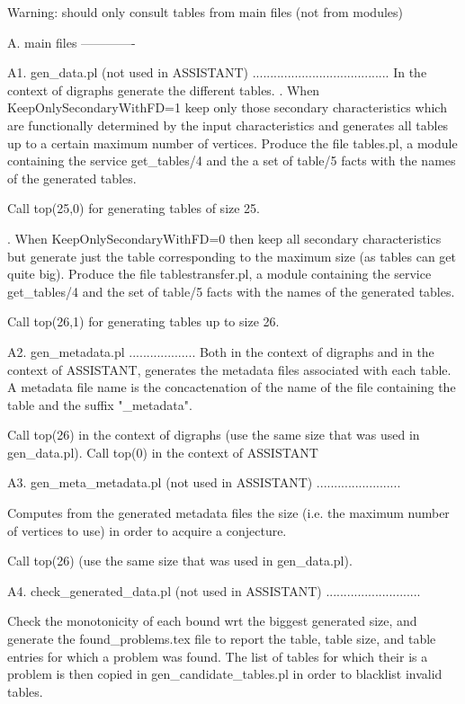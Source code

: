 Warning: should only consult tables from main files (not from modules)

A. main files
-------------

A1. gen_data.pl (not used in ASSISTANT)
.......................................
In the context of digraphs generate the different tables.
. When KeepOnlySecondaryWithFD=1 keep only those secondary characteristics
  which are functionally determined by the input characteristics and generates
  all tables up to a certain maximum number of vertices.
  Produce the file tables.pl, a module containing the service get_tables/4 and
  the a set of table/5 facts with the names of the generated tables.

  Call top(25,0) for generating tables of size 25.
  
. When KeepOnlySecondaryWithFD=0 then keep all secondary characteristics
  but generate just the table corresponding to the maximum size (as tables can get quite big).
  Produce the file tablestransfer.pl, a module containing the service get_tables/4 and the set
  of table/5 facts with the names of the generated tables.

  Call top(26,1) for generating tables up to size 26.


A2. gen_metadata.pl
...................
Both in the context of digraphs and in the context of ASSISTANT,
generates the metadata files associated with each table.
A metadata file name is the concactenation of the name of the file containing the table
and the suffix "_metadata".

 Call top(26) in the context of digraphs (use the same size that was used in gen_data.pl).
 Call top(0)  in the context of ASSISTANT


A3. gen_meta_metadata.pl (not used in ASSISTANT)
........................

Computes from the generated metadata files the size (i.e. the maximum number of vertices
to use) in order to acquire a conjecture.

 Call top(26) (use the same size that was used in gen_data.pl).


A4. check_generated_data.pl (not used in ASSISTANT)
...........................

Check the monotonicity of each bound wrt the biggest generated size,
and generate the found_problems.tex file to report the table, table size,
and table entries for which a problem was found.
The list of tables for which their is a problem is then copied in gen_candidate_tables.pl
in order to blacklist invalid tables.

